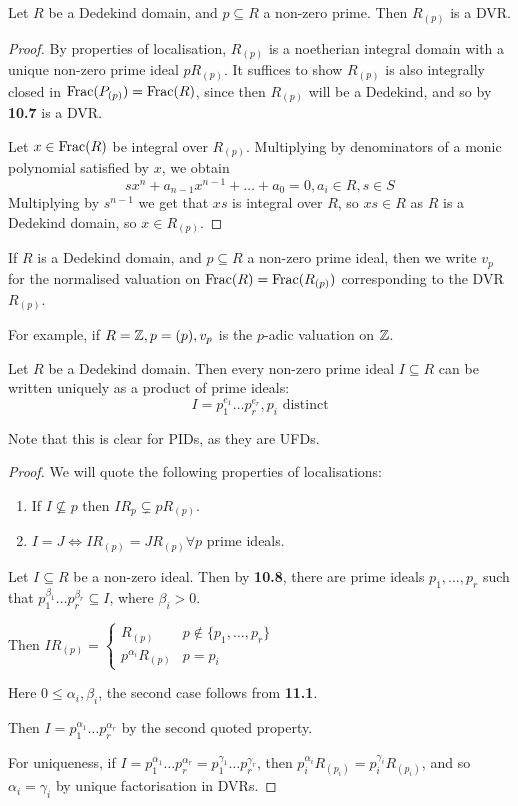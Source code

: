 \documentclass[10pt,a4paper]{article}
\begin{document}
\begin{corollary}
  Let $R$ be a Dedekind domain, and $p \subseteq R$ a non-zero prime. Then $R_{(p)}$ is a DVR.
\end{corollary}
\begin{proof}
  By properties of localisation, $R_{(p)}$ is a noetherian integral domain with a unique non-zero prime ideal $p R_(p)$. It suffices to show $R_{(p)}$ is also integrally closed in $\operatorname{Frac}(P_{(p)}) = \operatorname{Frac}(R)$, since then $R_{(p)}$ will be a Dedekind, and so by \textbf{10.7} is a DVR.

  Let $x \in \operatorname{Frac}(R)$ be integral over $R_{(p)}$. Multiplying by denominators of a monic polynomial satisfied by $x$, we obtain
  \[sx^n + a_{n-1}x^{n-1}+\ldots+a_0 = 0, a_i \in R, s \in S\]
  Multiplying by $s^{n-1}$ we get that $xs$ is integral over $R$, so $xs \in R$ as $R$ is a Dedekind domain, so $x \in R_{(p)}$.
\end{proof}
\begin{definition}
  If $R$ is a Dedekind domain, and $p \subseteq R$ a non-zero prime ideal, then we write $v_p$ for the normalised valuation on $\operatorname{Frac}(R) = \operatorname{Frac}(R_{(p)})$ corresponding to the DVR $R_{(p)}$.
\end{definition}
For example, if $R = \mathbb{Z}, p = (p), v_p$ is the $p$-adic valuation on $\mathbb{Z}$.
\begin{theorem}
  Let $R$ be a Dedekind domain. Then every non-zero prime ideal $I \subseteq R$ can be written uniquely as a product of prime ideals:
  \[I = p_1^{e_1}\ldots p_r^{e_r}, p_i \text{ distinct}\]
\end{theorem}
Note that this is clear for PIDs, as they are UFDs.
\begin{proof}
  We will quote the following properties of localisations:
  \begin{enumerate}
    \item If $I\nsubseteq p$ then $IR_{p} \subsetneq pR_{(p)}$.
    \item $I=J \iff IR_{(p)} = JR_{(p)} \forall p$ prime ideals.
  \end{enumerate}
  Let $I \subseteq R$ be a non-zero ideal. Then by \textbf{10.8}, there are prime ideals $p_1, \ldots, p_r$ such that $p_1^{\beta_1}\ldots p_r^{\beta_r} \subseteq I$, where $\beta_i >0$.

  Then $IR_{(p)} = \begin{cases} R_{(p)} & p \notin \{p_1, \ldots, p_r\}\\p^{\alpha_i}R_{(p)} & p=p_i \end{cases}$

  Here $0 \leq \alpha_i, \beta_i$, the second case follows from \textbf{11.1}.

  Then $I = p_1^{\alpha_1}\ldots p_r^{\alpha_r}$ by the second quoted property.

  For uniqueness, if $I = p_1^{\alpha_1}\ldots p_r^{\alpha_r} = p_1^{\gamma_1}\ldots p_r^{\gamma_r}$, then $p_i^{\alpha_i}R_{(p_i)} = p_i^{\gamma_i}R_{(p_i)}$, and so $\alpha_i =\gamma_i$ by unique factorisation in DVRs.
\end{proof}
\end{document}
